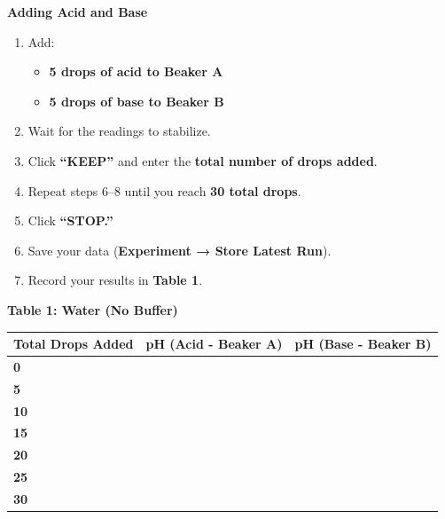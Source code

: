 \documentclass[
  letterpaper,
  DIV=11,
  numbers=noendperiod]{scrreprt}
\newcounter{none} %
\begin{document}
\textbf{Adding Acid and Base}

\begin{enumerate}
\def\labelenumi{\arabic{enumi}.}
\setcounter{enumi}{5}
\item
  Add:

  \begin{itemize}
  \item
    \textbf{5 drops of acid to Beaker A}
  \item
    \textbf{5 drops of base to Beaker B}
  \end{itemize}
\item
  Wait for the readings to stabilize.
\item
  Click \textbf{``KEEP''} and enter the \textbf{total number of drops
  added}.
\item
  Repeat steps 6--8 until you reach \textbf{30 total drops}.
\item
  Click \textbf{``STOP.''}
\item
  Save your data (\textbf{Experiment → Store Latest Run}).
\item
  Record your results in \textbf{Table 1}.
\end{enumerate}

\textbf{Table 1: Water (No Buffer)}

{\def\LTcaptype{none} %
\begin{longtable}[]{@{}
  >{\centering\arraybackslash}p{}
  >{\raggedright\arraybackslash}p{}
  >{\raggedright\arraybackslash}p{}@{}}
\toprule\noalign{}
\begin{minipage}[b]{\linewidth}\centering
\textbf{Total Drops Added}
\end{minipage} & \begin{minipage}[b]{\linewidth}\raggedright
\textbf{pH (Acid - Beaker A)}
\end{minipage} & \begin{minipage}[b]{\linewidth}\raggedright
\textbf{pH (Base - Beaker B)}
\end{minipage} \\
\midrule\noalign{}
\endhead
\bottomrule\noalign{}
\endlastfoot
\textbf{0} & & \\
\textbf{5} & & \\
\textbf{10} & & \\
\textbf{15} & & \\
\textbf{20} & & \\
\textbf{25} & & \\
\textbf{30} & & \\
\end{longtable}
}
\end{document}
